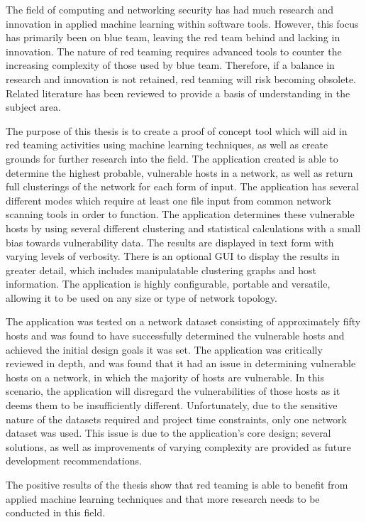 \begin{abstractlong}
The field of computing and networking security has had much research and innovation in applied machine learning within software tools. However, this focus has primarily been on blue team, leaving the red team behind and lacking in innovation. The nature of red teaming requires advanced tools to counter the increasing complexity of those used by blue team. Therefore, if a balance in research and innovation is not retained, red teaming will risk becoming obsolete. Related literature has been reviewed to provide a basis of understanding in the subject area.

The purpose of this thesis is to create a proof of concept tool which will aid in red teaming activities using machine learning techniques, as well as create grounds for further research into the field. The application created is able to determine the highest probable, vulnerable hosts in a network, as well as return full clusterings of the network for each form of input. The application has several different modes which require at least one file input from common network scanning tools in order to function. The application determines these vulnerable hosts by using several different clustering and statistical calculations with a small bias towards vulnerability data. The results are displayed in text form with varying levels of verbosity. There is an optional GUI to display the results in greater detail, which includes manipulatable clustering graphs and host information. The application is highly configurable, portable and versatile, allowing it to be used on any size or type of network topology. 

The application was tested on a network dataset consisting of approximately fifty hosts and was found to have successfully determined the vulnerable hosts and achieved the initial design goals it was set. The application was critically reviewed in depth, and was found that it had an issue in determining vulnerable hosts on a network, in which the majority of hosts are vulnerable. In this scenario, the application will disregard the vulnerabilities of those hosts as it deems them to be insufficiently different. Unfortunately, due to the sensitive nature of the datasets required and project time constraints, only one network dataset was used. This issue is due to the application's core design; several solutions, as well as improvements of varying complexity are provided as future development recommendations. 

The positive results of the thesis show that red teaming is able to benefit from applied machine learning techniques and that more research needs to be conducted in this field.
\end{abstractlong}